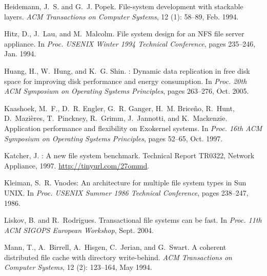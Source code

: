 \documentclass[9pt,twocolumn,letterpaper]{article}
\begin{document}
\begin{footnotesize}
\begin{thebibliography}{43}
Heidemann, J.~S. and G.~J. Popek.
\newblock File-system development with stackable layers.
\newblock \emph{{ACM} Transactions on Computer Systems}, 12
  (1): 58--89, Feb. 1994.

Hitz, D., J.~Lau, and M.~Malcolm.
\newblock File system design for an {NFS} file server appliance.
\newblock In \emph{Proc. USENIX Winter 1994 Technical Conference}, pages
  235--246, Jan. 1994.

Huang, H., W.~Hung, and K.~G. Shin.
: Dynamic data replication in free disk space for improving disk
  performance and energy consumption.
\newblock In \emph{Proc. 20th {ACM} {S}ymposium on {O}perating {S}ystems
  {P}rinciples}, pages 263--276, Oct. 2005.

Kaashoek, M.~F., D.~R. Engler, G.~R. Ganger, H.~M. Brice{\~{n}}o, R.~Hunt,
  D.~Mazi{\`{e}}res, T.~Pinckney, R.~Grimm, J.~Jannotti, and K.~Mackenzie.
\newblock Application performance and flexibility on {E}xokernel systems.
\newblock In \emph{Proc. 16th {ACM} {S}ymposium on {O}perating {S}ystems
  {P}rinciples}, pages 52--65, Oct. 1997.

Katcher, J.
: A new file system benchmark.
\newblock Technical Report TR0322, Network Appliance, 1997.
\newblock \url{http://tinyurl.com/27ommd}.

Kleiman, S.~R.
\newblock Vnodes: An architecture for multiple file system types in {S}un
  {UNIX}.
\newblock In \emph{Proc. USENIX Summer 1986 Technical Conference}, pages
  238--247, 1986.

Liskov, B. and R.~Rodrigues.
\newblock Transactional file systems can be fast.
\newblock In \emph{Proc. 11th ACM SIGOPS European Workshop}, Sept. 2004.

Mann, T., A.~Birrell, A.~Hisgen, C.~Jerian, and G.~Swart.
\newblock A coherent distributed file cache with directory write-behind.
\newblock \emph{{ACM} Transactions on Computer Systems}, 12
  (2): 123--164, May 1994.


\end{thebibliography}
\end{footnotesize}
\end{document}
